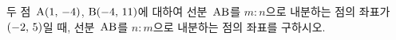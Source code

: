 두 점~$\mathrm{A}(1,\mkern3mu -4)$, $\mathrm{B}(-4,\mkern3mu 11)$에 대하여 선분~$\mathrm{AB}$를 $m:n$으로 내분하는 점의 좌표가 $(-2,\mkern3mu 5)$일 때, 선분~$\mathrm{AB}$를 $n:m$으로 내분하는 점의 좌표를 구하시오. 
